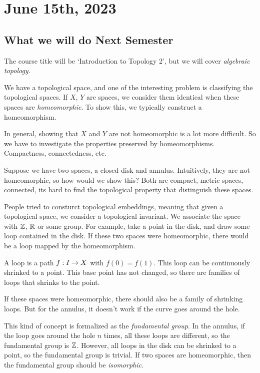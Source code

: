 \section*{June 15th, 2023}

\subsection*{What we will do Next Semester}

The course title will be `Introduction to Topology 2', but we will cover \textit{algebraic topology}.

We have a topological space, and one of the interesting problem is classifying the topological spaces. If \(X\), \(Y\) are spaces, we consider them identical when these spaces are \textit{homeomorphic}. To show this, we typically construct a homeomorphism.

In general, showing that \(X\) and \(Y\) are not homeomorphic is a lot more difficult. So we have to investigate the properties preserved by homeomorphisms. Compactness, connectedness, etc.

Suppose we have two spaces, a closed disk and annulus. Intuitively, they are not homeomorphic, so how would we show this? Both are compact, metric spaces, connected, its hard to find the topological property that distinguish these spaces.

People tried to consturct topological embeddings, meaning that given a topological space, we consider a topological invariant. We associate the space with \(\mathbb{Z}\), \(\mathbb{R}\) or some group. For example, take a point in the disk, and draw some loop contained in the disk. If these two spaces were homeomorphic, there would be a loop mapped by the homeomorphism.

A loop is a path \(f : I \rightarrow X\) with \(f(0) = f(1)\). This loop can be continuously shrinked to a point. This base point has not changed, so there are families of loops that shrinks to the point.

If these spaces were homeomorphic, there should also be a family of shrinking loops. But for the annulus, it doesn't work if the curve goes around the hole.

This kind of concept is formalized as the \textit{fundamental group}. In the annulus, if the loop goes around the hole \(n\) times, all these loops are different, so the fundamental group is \(\mathbb{Z}\). However, all loops in the disk can be shrinked to a point, so the fundamental group is trivial. If two spaces are homeomorphic, then the fundamental group should be \textit{isomorphic}.

